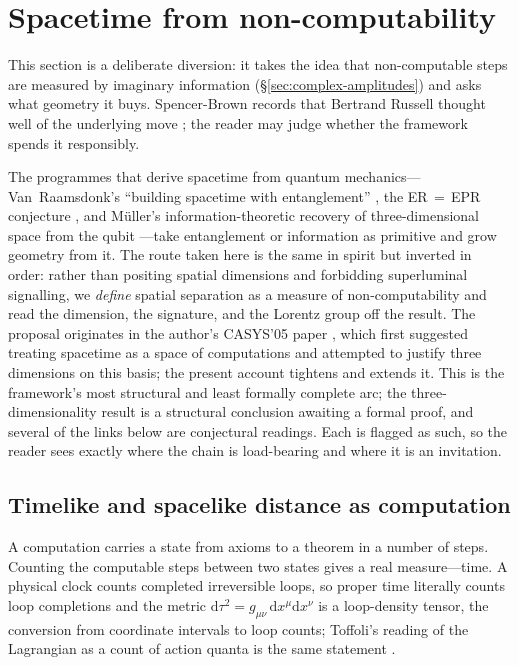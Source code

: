 \section{Spacetime from non-computability}
\label{sec:space-of-computations}

This section is a deliberate diversion: it takes the idea that non-computable steps are measured
by imaginary information (\S\ref{sec:complex-amplitudes}) and asks what geometry it buys.
Spencer-Brown records that Bertrand Russell thought well of the underlying move
\autocite{Spence-Brown-1969}; the reader may judge whether the framework spends it responsibly.

The programmes that derive spacetime from quantum mechanics---Van~Raamsdonk's
\enquote{building spacetime with entanglement} \autocite{VanRaamsdonk2010}, the
ER\,$=$\,EPR conjecture \autocite{MaldacenaSusskind2013}, and M\"uller's
information-theoretic recovery of three-dimensional space from the qubit
\autocite{MuellerMasanes2013}---take entanglement or information as primitive and
grow geometry from it. The route taken here is the same in spirit but inverted in
order: rather than positing spatial dimensions and forbidding superluminal
signalling, we \emph{define} spatial separation as a measure of non-computability
and read the dimension, the signature, and the Lorentz group off the result. The
proposal originates in the author's CASYS'05 paper \autocite{small_2006}, which
first suggested treating spacetime as a space of computations and attempted to
justify three dimensions on this basis; the present account tightens and extends
it. This is the framework's most structural and least formally complete arc; the
three-dimensionality result is a structural conclusion awaiting a formal proof,
and several of the links below are conjectural readings. Each is flagged as such,
so the reader sees exactly where the chain is load-bearing and where it is an
invitation.

\subsection{Timelike and spacelike distance as computation}
\label{sec:comp-distance}

A computation carries a state from axioms to a theorem in a number of steps.
Counting the computable steps between two states gives a real measure---time. A
physical clock counts completed irreversible loops, so proper time literally
counts loop completions and the metric $\mathrm{d}\tau^{2}=g_{\mu\nu}\,
\mathrm{d}x^{\mu}\mathrm{d}x^{\nu}$ is a loop-density tensor, the conversion from
coordinate intervals to loop counts; Toffoli's reading of the Lagrangian as a
count of action quanta is the same statement \autocite{toffoli_2003}.

